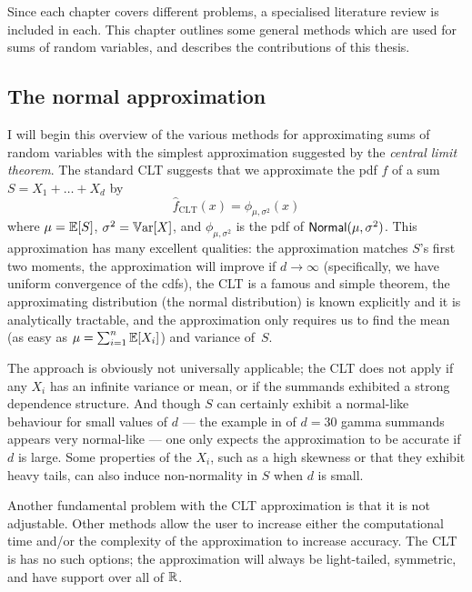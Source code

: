 Since each chapter covers different problems, a specialised literature review is included in each. This chapter outlines some general methods which are used for sums of random variables, and describes the contributions of this thesis.


\subsection{The normal approximation}

I will begin this overview of the various methods for approximating sums of random variables with the simplest approximation suggested by the \emph{central limit theorem}. The standard CLT suggests that we approximate the pdf $f$ of a sum $S = X_1 + \dots + X_d$ by
\[ \hat{f}_{\mathrm{CLT}}(x) = \phi_{\mu,\sigma^2}(x) \]
where $\mu=\operatorname{{\mathbb E}}[S]$, $\sigma^2=\operatorname{\mathbb{V}\mathrm{ar}}[X]$, and $\phi_{\mu,\sigma^2}$ is the pdf of $\mathsf{Normal}(\mu,\sigma^2)$.
This approximation has many excellent qualities: the approximation matches $S$'s first two moments, the approximation will improve if $d \to \infty$ (specifically, we have uniform convergence of the cdfs), the CLT is a famous and simple theorem, the approximating distribution (the normal distribution) is known explicitly and it is analytically tractable, and the approximation only requires us to find the mean (as easy as $\mu = \sum_{i=1}^n \operatorname{{\mathbb E}}[X_i]$) and variance of~$S$.

The approach is obviously not universally applicable; the CLT does not apply if any $X_i$ has an infinite variance or mean, or if the summands exhibited a strong dependence structure. And though $S$ can certainly exhibit a normal-like behaviour for small values of $d$ --- the example in  of $d=30$ gamma summands appears very normal-like --- one only expects the approximation to be accurate if $d$ is large. Some properties of the $X_i$, such as a high skewness or that they exhibit heavy tails, can also induce non-normality in $S$ when $d$ is small.

Another fundamental problem with the CLT approximation is that it is not adjustable. Other methods allow the user to increase either the computational time and/or the complexity of the approximation to increase accuracy. The CLT is has no such options; the approximation will always be light-tailed, symmetric, and have support over all of $\mathbb{R}$.


